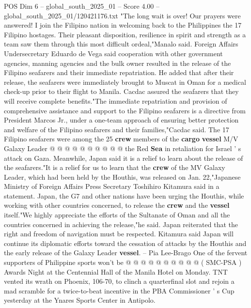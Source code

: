 \begin{textsample}{POS Dim 6 – global\_south\_2025\_01 – Score 4.00 – global\_south\_2025\_01/120421176.txt}  \label{ex:f6_pos_445}
"The long wait is over!
Our prayers were answered!
I join the Filipino nation in welcoming back to the Philippines the 17 Filipino hostages.
Their pleasant disposition, resilience in spirit and strength as a team saw them through this most difficult ordeal,"Manalo said.
Foreign Affairs Undersecretary Eduardo de Vega said cooperation with other government agencies, manning agencies and the bulk owner resulted in the release of the Filipino seafarers and their immediate repatriation.
He added that after their release, the seafarers were immediately brought to Muscat in Oman for a medical check-up prior to their flight to Manila.
Cacdac assured the seafarers that they will receive complete benefits."The immediate repatriation and provision of comprehensive assistance and support to the Filipino seafarers is a directive from President Marcos Jr., under a one-team approach of ensuring better protection and welfare of the Filipino seafarers and their families,"Cacdac said.
The 17 Filipino seafarers were among the 25 \textbf{crew} members of the \textbf{cargo} \textbf{vessel} M/V Galaxy Leader @ @ @ @ @ @ @ @ @ @ the Red \textbf{Sea} in retaliation for Israel ' s attack on Gaza.
Meanwhile, Japan said it is a relief to learn about the release of the seafarers."It is a relief for us to learn that the \textbf{crew} of the MV Galaxy Leader, which had been held by the Houthis, was released on Jan. 22,"Japanese Ministry of Foreign Affairs Press Secretary Toshihiro Kitamura said in a statement.
Japan, the G7 and other nations have been urging the Houthis, while working with other countries concerned, to release the \textbf{crew} and the \textbf{vessel} itself."We highly appreciate the efforts of the Sultanate of Oman and all the countries concerned in achieving the release,"he said.
Japan reiterated that the right and freedom of navigation must be respected.
Kitamura said Japan will continue its diplomatic efforts toward the cessation of attacks by the Houthis and the early release of the Galaxy Leader \textbf{vessel}. -- Pia Lee-Brago One of the fervent supporters of Philippine sports won't be @ @ @ @ @ @ @ @ @ @ ( SMC-PSA ) Awards Night at the Centennial Hall of the Manila Hotel on Monday.
TNT vented its wrath on Phoenix, 106-70, to clinch a quarterfinal slot and rejoin a mad scramble for a twice-to-beat incentive in the PBA Commissioner ' s Cup yesterday at the Ynares Sports Center in Antipolo.

\end{textsample}
